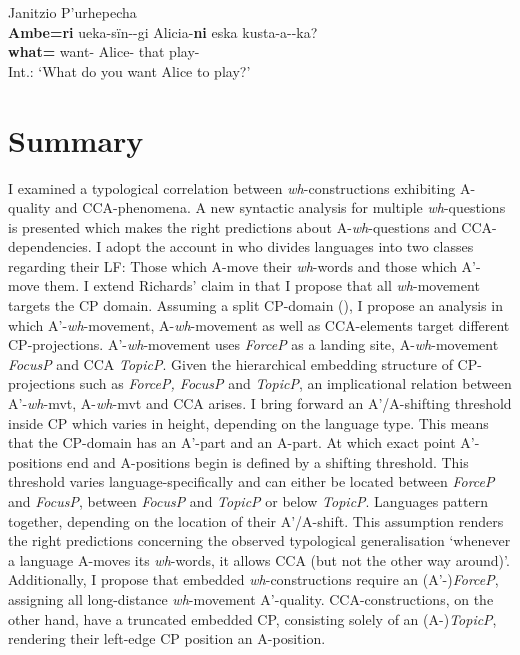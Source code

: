 \documentclass[output=paper,colorlinks,citecolor=brown]{langscibook}
\begin{document}
\ea Janitzio P’urhepecha \citep[114]{zyman2018rich}\\
\gll * \textquestiondown \textbf{Ambe=ri} ueka-s\"{i}n-\varnothing-gi Alicia-\textbf{ni} eska kusta-a-\varnothing-ka?\\
{} \textbf{what=} want- Alice-\textbf{} that play-\\
\glt \phantom{*} Int.: ‘What do you want Alice to play?'\\
\z 

\section{Summary}
I examined a typological correlation between \textit{wh}-constructions exhibiting A-quality and CCA-phenomena. A new syntactic analysis for multiple \textit{wh}-questions is presented which makes the right predictions about A-\textit{wh}-questions and CCA-dependencies. I adopt the account in \citet{richards1997} who divides languages into two classes regarding their LF: Those which A-move their \textit{wh}-words and those which A'-move them. I extend Richards' claim in that I propose that all \textit{wh}-movement targets the CP domain. Assuming a split CP-domain (\citealp{rizzi1997fine}), I propose an analysis in which A'-\textit{wh}-movement, A-\textit{wh}-movement as well as CCA-elements target different CP-projections. A'-\textit{wh}-movement uses \emph{ForceP} as a landing site, A-\textit{wh}-movement \emph{FocusP} and CCA \emph{TopicP}. Given the hierarchical embedding structure of CP-projections such as \emph{ForceP, FocusP} and \emph{TopicP}, an implicational relation between A'-\textit{wh}-mvt, A-\textit{wh}-mvt and CCA arises. I bring forward an A'/A-shifting threshold inside CP which varies in height, depending on the language type. This means that the CP-domain has an A'-part and an A-part. At which exact point A'-positions end and A-positions begin is defined by a shifting threshold. This threshold varies language-specifically and can either be located between \emph{ForceP} and \emph{FocusP}, between \emph{FocusP} and \emph{TopicP} or below \emph{TopicP}. Languages pattern together, depending on the location of their A'/A-shift. This assumption renders the right predictions concerning the observed typological generalisation ‘whenever a language A-moves its \textit{wh}-words, it allows CCA (but not the other way around)'.  Additionally, I propose that embedded \textit{wh}-constructions require an (A'-)\emph{ForceP}, assigning all long-distance \textit{wh}-movement A'-quality. CCA-constructions, on the other hand, have a truncated embedded CP, consisting solely of an (A-)\emph{TopicP}, rendering their left-edge CP position an A-position. 
\end{document}
